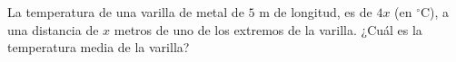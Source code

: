 \item La temperatura de una varilla de metal de $5 \text{ m}$ de longitud, es de $4x$ (en $^\circ\text{C}$), a una distancia de $x$ metros de uno de los extremos de la varilla. ¿Cuál es la temperatura media de la varilla?
